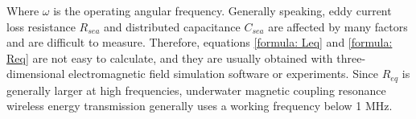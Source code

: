 Where $\omega$ is the operating angular frequency. Generally speaking, eddy current loss resistance $R_{sea}$ and distributed capacitance $C_{sea}$ are affected by many factors and are difficult to measure. Therefore, equations \ref{formula: Leq} and \ref{formula: Req} are not easy to calculate, and they are usually obtained with three-dimensional electromagnetic field simulation software or experiments. Since $R_{eq}$ is generally larger at high frequencies, underwater magnetic coupling resonance wireless energy transmission generally uses a working frequency below 1 MHz.